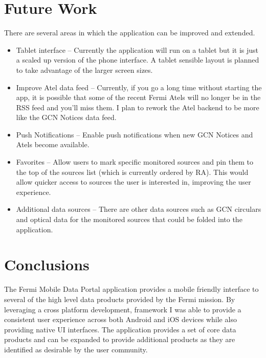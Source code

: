 \section{Future Work}
There are several areas in which the application can be improved and extended. 
\begin{itemize}
\item{Tablet interface -- Currently the application will run on a tablet but it is just a scaled up version of the phone interface.  A tablet sensible layout is planned to take advantage of the larger screen sizes.}
\item{Improve Atel data feed -- Currently, if you go a long time without starting the app, it is possible that some of the recent Fermi Atels will no longer be in the RSS feed and you'll miss them.  I plan to rework the Atel backend to be more like the GCN Notices data feed.}
\item{Push Notifications -- Enable push notifications when new GCN Notices and Atels become available.}
\item{Favorites -- Allow users to mark specific monitored sources and pin them to the top of the sources list (which is currently ordered by RA). This would allow quicker access to sources the user is interested in, improving the user experience.}
\item{Additional data sources -- There are other data sources such as GCN circulars and optical data for the monitored sources that could be folded into the application.}
\end{itemize}

\section{Conclusions}
The Fermi Mobile Data Portal application provides a mobile friendly interface to several of the high level data products provided by the Fermi mission.  By leveraging a cross platform development, framework I was able to provide a consistent user experience across both Android and iOS devices while also providing native UI interfaces.  The application provides a set of core data products and can be expanded to provide additional products as they are identified as desirable by the user community.
